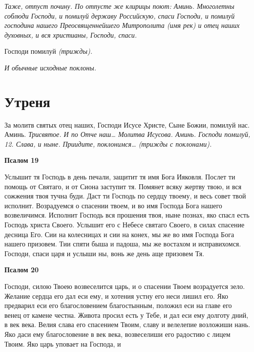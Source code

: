 \itshape Таже, отпуст почину. По отпусте же клирицы поют:\normalfont{} Аминь. Многолетны
соблюди Господи, и помилуй державу Российскую, спаси Господи, и помилуй
господина нашего Преосвященнейшего Митрополита \itshape (имя рек)\normalfont{} и отец наших
духовных, и вся христианы, Господи, спаси.


   Господи помилуй \itshape (трижды)\normalfont{}.


 \itshape И обычные исходные поклоны.\normalfont{}


\section{Утреня}



   За молитв святых отец наших, Господи Исусе Христе, Сыне Божии,
помилуй нас. Аминь. \itshape Трисвятое\normalfont{}. \itshape И по\normalfont{} Отче наш… \itshape Молитва Исусова\normalfont{}. Аминь.
Господи помилуй, \itshape 12\normalfont{}. \itshape Слава, и ныне\normalfont{}. Приидите, поклонимся… \itshape (трижды с
поклонами)\normalfont{}.






 

\bfseries Псалом 19\normalfont{}


   Услышит тя Господь в день печали, защитит тя имя Бога Ияковля.
Послет ти помощь от Святаго, и от Сиона заступит тя. Помянет всяку
жертву твою, и вся сожжения твоя тучна буди. Даст ти Господь по сердцу
твоему, и весь совет твой исполнит. Возрадуемся о спасении твоем, и во имя
Господа Бога нашего возвеличимся. Исполнит Господь вся прошения твоя,
ныне познах, яко спасл есть Господь христа Своего. Услышит его с Небесе
святаго Своего, в силах спасение десница Его. Сии на колесницах и сии на
конех, мы же во имя Господа Бога нашего призовем. Тии спяти быша и
падоша, мы же востахом и исправихомся. Господи, спаси царя и услыши ны,
вонь же день аще призовем Тя.






 

\bfseries Псалом 20\normalfont{}


   Господи, силою Твоею возвеселится царь, и о спасении Твоем возрадуется
зело. Желание сердца его дал еси ему, и хотения устну его неси лишил его.
Яко предварил еси его благословением благостынным, положил еси на главе
его венец от камене честна. Живота просил есть у Тебе, и дал еси ему
долготу дний, в век века. Велия слава его спасением Твоим, славу и
велелепие возложиши нань. Яко даси ему благословение в век века,
возвеселиши его радостию с лицем Твоим. Яко царь уповает на Господа, и

